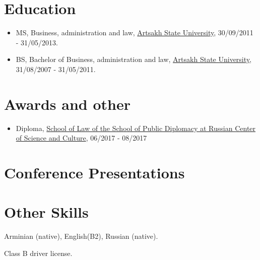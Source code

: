 \documentclass{article}
\begin{document}
 
 
\section{Education}
\begin{itemize}
\item MS, Business, administration and law, \href{http://www.asu.am/}{Artsakh State University},  30/09/2011 - 31/05/2013.
\item BS, Bachelor of Business, administration and law, \href{http://www.asu.am/}{Artsakh State University}, 31/08/2007 - 31/05/2011.
\end{itemize}

 
\section{Awards and other}
\begin{itemize}
\item Diploma, \href{http://www.schoolofpublicdiplomacy.com/}{School of Law of the School of Public Diplomacy at Russian Center of Science and Culture},  06/2017 - 08/2017 
\end{itemize}
 
\section{Conference Presentations }
 
 
\section{Other Skills}
\begin{description}[widest=Langauges]
\item[Langauges]  Arminian (native), English(B2), Russian (native).
\item[Other]  Class B driver license.
\end{description}
\end{document}
